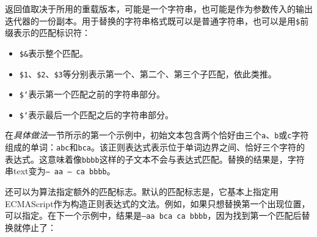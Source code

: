 
返回值取决于所用的重载版本，可能是一个字符串，也可能是作为参数传入的输出迭代器的一份副本。用于替换的字符串格式既可以是普通字符串，也可以是用\texttt{\$}前缀表示的匹配标识符：



\begin{itemize}
\item \texttt{\$\&}表示整个匹配。



\item \texttt{\$1}、\texttt{\$2}、\texttt{\$3}等分别表示第一个、第二个、第三个子匹配，依此类推。



\item \texttt{\$`}表示第一个匹配之前的字符串部分。



\item \texttt{\$‘}表示最后一个匹配之后的字符串部分。

\end{itemize}



在\textit{具体做法}一节所示的第一个示例中，初始文本包含两个恰好由三个\texttt{a}、\texttt{b}或\texttt{c}字符组成的单词：\texttt{abc}和\texttt{bca}。该正则表达式表示位于单词边界之间、恰好三个字符的表达式。这意味着像\texttt{bbbb}这样的子文本不会与表达式匹配。替换的结果是，字符串text变为\texttt{--- aa --- ca bbbb}。



还可以为算法指定额外的匹配标志。默认的匹配标志是，它基本上指定用ECMAScript作为构造正则表达式的文法。例如，如果只想替换第一个出现位置，可以指定。在下一个示例中，结果是\texttt{---\allowbreak{}aa bca ca bbbb}，因为找到第一个匹配后替换就停止了：



